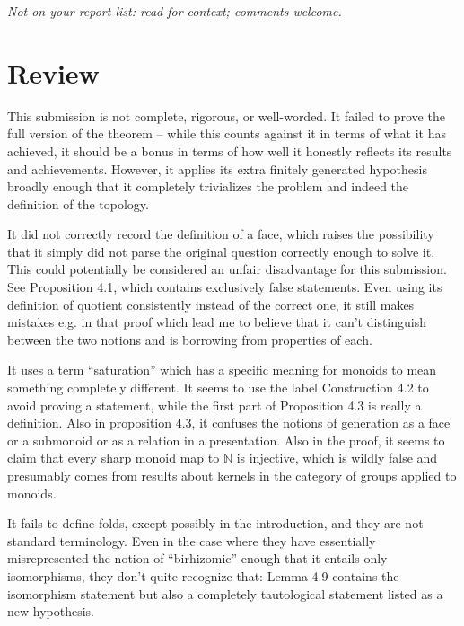 \documentclass[11pt]{article}
\theoremstyle{definition}
\begin{document}
\maketitle
\noindent\textit{Not on your report list: read for context; comments welcome.}

\section{Review}

This submission is not complete, rigorous, or well-worded. It failed to prove the full version of the theorem -- while this counts against it in terms of what it has achieved, it should be a bonus in terms of how well it honestly reflects its results and achievements. However, it applies its extra finitely generated hypothesis broadly enough that it completely trivializes the problem and indeed the definition of the topology. 

It did not correctly record the definition of a face, which raises the possibility that it simply did not parse the original question correctly enough to solve it. This could potentially be considered an unfair disadvantage for this submission. See Proposition 4.1, which contains exclusively false statements. Even using its definition of quotient consistently instead of the correct one, it still makes mistakes e.g. in that proof which lead me to believe that it can't distinguish between the two notions and is borrowing from properties of each. 


It uses a term ``saturation'' which has a specific meaning for monoids to mean something completely different. It seems to use the label Construction 4.2 to avoid proving a statement, while the first part of Proposition 4.3 is really a definition. Also in proposition 4.3, it confuses the notions of generation as a face or a submonoid or as a relation in a presentation. Also in the proof, it seems to claim that every sharp monoid map to $\mathbb N$ is injective, which is wildly false and presumably comes from results about kernels in the category of groups applied to monoids. 

It fails to define folds, except possibly in the introduction, and they are not standard terminology. Even in the case where they have essentially misrepresented the notion of ``birhizomic'' enough that it entails only isomorphisms, they don't quite recognize that: Lemma 4.9 contains the isomorphism statement but also a completely tautological statement listed as a new hypothesis. 
\end{document}
